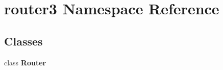 \section{router3 Namespace Reference}
\label{namespacerouter3}
\subsection*{Classes}
\begin{DoxyCompactItemize}
\item 
class \textbf{ Router}
\end{DoxyCompactItemize}
